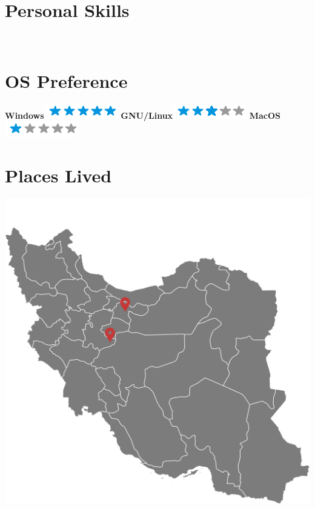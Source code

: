 \documentclass[a4paper]{friggeri-cv}
\begin{document}
\begin{aside}
  \section{Personal Skills}
~
  \section{OS Preference}
    \textbf{Windows}\includegraphics[scale=0.40]{img/5stars.png}
    \textbf{GNU/Linux}\includegraphics[scale=0.40]{img/3stars.png}
    \textbf{MacOS}\includegraphics[scale=0.40]{img/1stars.png}
    ~
  \section{Places Lived}
    \includegraphics[scale=0.5]{img/iran.png}
    ~

\end{aside}
\end{document}
